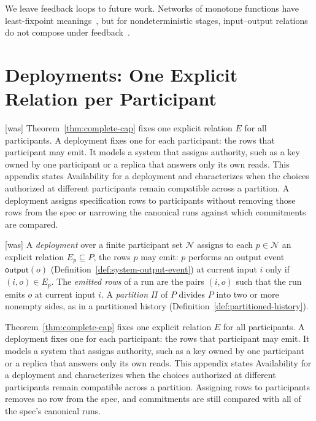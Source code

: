 \documentclass[sigconf]{cidr-2027}
\theoremstyle{remark}
\newcommand{\commitments}{commitments\xspace}
\begin{document}
We leave feedback loops to future work.  Networks of monotone functions have
least-fixpoint meanings~\cite{kahn1974semantics}, but for nondeterministic
stages, input--output relations do not compose under
feedback~\cite{brock1981scenarios}.


\section{Deployments: One Explicit Relation per Participant}
\label{app:deployment}



{\footnotesize\color{black!50}\noindent\textsf{[was]} Theorem~\ref{thm:complete-cap} fixes one explicit relation $E$ for all
participants.  A deployment fixes one for each participant: the rows that
participant may emit.  It models a system that assigns authority, such as a
key owned by one participant or a replica that answers only its own reads.
This appendix states Availability for a deployment and characterizes when the
choices authorized at different participants remain compatible across a
partition.  A deployment assigns specification rows to participants without
removing those rows from the spec or narrowing the canonical runs against which
\commitments are compared.\par}



{\footnotesize\color{black!50}\noindent\textsf{[was]} A \emph{deployment} over a finite participant set $\mathcal N$ assigns to each $p\in\mathcal N$
an explicit relation $E_p\subseteq P$, the rows $p$ may emit: $p$ performs an output event
$\mathsf{output}(o)$ (Definition~\ref{def:system-output-event}) at current input
$i$ only if $(i,o)\in E_p$.  The \emph{emitted rows} of a run are the pairs
$(i,o)$ such that the run emits $o$ at current input $i$.  A \emph{partition} $\Pi$ of $P$ divides $P$ into
two or more nonempty sides, as in a partitioned history
(Definition~\ref{def:partitioned-history}).\par}

\color{blue!70!black}Theorem~\ref{thm:complete-cap} fixes one explicit relation $E$ for all
participants.  A deployment fixes one for each participant: the rows that
participant may emit.  It models a system that assigns authority, such as a
key owned by one participant or a replica that answers only its own reads.
This appendix states Availability for a deployment and characterizes when the
choices authorized at different participants remain compatible across a
partition.  Assigning rows to participants removes no row from the spec, and
\commitments are still compared with all of the spec's canonical runs.\color{black}
\end{document}
